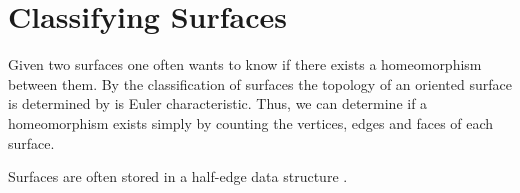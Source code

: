 \section{Classifying Surfaces}
\label{sec:classiify}


Given two surfaces one often wants to know
if there exists a homeomorphism between them.
By the classification of surfaces the topology of
an oriented surface is determined by is Euler characteristic.
Thus, we can determine if a homeomorphism exists simply by
counting the vertices, edges and faces of each surface.

Surfaces are often stored in a half-edge data structure \cite{Marks,Crane:2013}.
